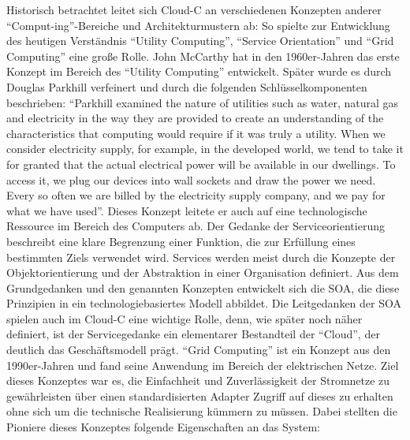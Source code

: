 Historisch betrachtet leitet sich \ac{Cloud-C} an verschiedenen Konzepten anderer \enquote{Comput-ing}-Bereiche und Architekturmustern ab: So spielte zur Entwicklung des heutigen Verständnis \enquote{Utility Computing}, \enquote{Service Orientation} und \enquote{Grid Computing} eine große Rolle.\autocite[vgl.][S.\,3-5]{hill_guide_2013} John McCarthy hat in den 1960er-Jahren das erste Konzept im Bereich des \enquote{Utility Computing} entwickelt.\autocite[vgl.][]{mccarthy_reminiscences_1983} Später wurde es durch Douglas Parkhill verfeinert und durch die folgenden Schlüsselkomponenten beschrieben: \enquote{Parkhill examined the nature of utilities such as water, natural gas and electricity in the way they are provided to create an understanding of the characteristics that computing would require if it was truly a utility. When we consider electricity supply, for example, in the developed world, we tend to take it for granted that the actual electrical power will be available in our dwellings. To access it, we plug our devices into wall sockets and draw the power we need. Every so often we are billed by the electricity supply company, and we pay for what we have used}.\autocite[vgl.][]{parkhill_challenge_1966} Dieses Konzept leitete er auch auf eine technologische Ressource im Bereich des Computers ab.\autocite[vgl.][S.\,4]{hill_guide_2013} Der Gedanke der Serviceorientierung beschreibt eine klare Begrenzung einer Funktion, die zur Erfüllung eines bestimmten Ziels verwendet wird. Services werden meist durch die Konzepte der Objektorientierung und der Abstraktion in einer Organisation definiert. Aus dem Grundgedanken und den genannten Konzepten entwickelt sich die \ac{SOA}, die diese Prinzipien in ein technologiebasiertes Modell abbildet. Die Leitgedanken der \ac{SOA} spielen auch im \ac{Cloud-C} eine wichtige Rolle, denn, wie später noch näher definiert, ist der Servicegedanke ein elementarer Bestandteil der \enquote{Cloud}, der deutlich das Geschäftsmodell prägt. \enquote{Grid Computing} ist ein Konzept aus den 1990er-Jahren und fand seine Anwendung im Bereich der elektrischen Netze.\autocite[vgl.][]{weinhardt_cloud_2009} Ziel dieses Konzeptes war es, die Einfachheit und Zuverlässigkeit der Stromnetze zu gewährleisten über einen standardisierten Adapter Zugriff auf dieses zu erhalten ohne sich um die technische Realisierung kümmern zu müssen. Dabei stellten die Pioniere dieses Konzeptes folgende Eigenschaften\autocite[vgl.][]{foster_grid_1999} an das System:

